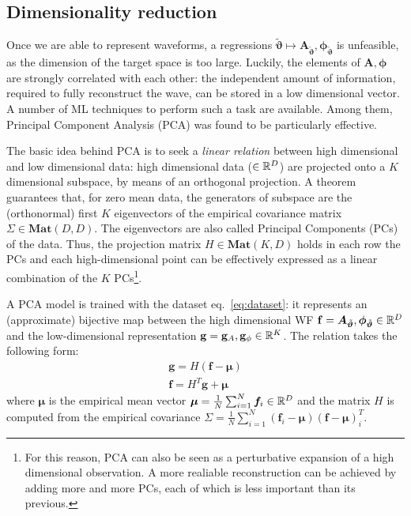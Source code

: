 \subsection{Dimensionality reduction}
Once we are able to represent waveforms, a regressions ${\tilde{\boldsymbol{\vartheta}}} \longmapsto \boldsymbol{A}_{{\tilde{\boldsymbol{\vartheta}}}}, \boldsymbol{\phi}_{{\tilde{\boldsymbol{\vartheta}}}}$ is unfeasible, as the dimension of the target space is too large. Luckily, the elements of $\boldsymbol{A}, \boldsymbol{\phi}$ are strongly correlated with each other: the independent amount of information, required to fully reconstruct the wave, can be stored in a low dimensional vector.
A number of ML techniques to perform such a task are available. Among them, Principal Component Analysis (PCA) \cite[ch. 12]{murphy2012machine} was found to be particularly effective.
\par
The basic idea behind PCA is to seek a \textit{linear relation} between high dimensional and low dimensional data: high dimensional data ($\in \mathbb{R}^D$) are projected onto a $K$ dimensional subspace, by means of an orthogonal projection.
A theorem \cite[sec. 12.2.1]{murphy2012machine} guarantees that, for zero mean data, the generators of subspace are the (orthonormal) first $K$ eigenvectors of the empirical covariance matrix $\Sigma \in \mathbf{Mat}(D,D)$. The eigenvectors are also called Principal Components (PCs) of the data.
Thus, the projection matrix $H\in \mathbf{Mat}(K,D)$ holds in each row the PCs and each high-dimensional point can be effectively expressed as a linear combination of the $K$ PCs\footnote{For this reason, PCA can also be seen as a perturbative expansion of a high dimensional observation. A more realiable reconstruction can be achieved by adding more and more PCs, each of which is less important than its previous.}.
\par
A PCA model is trained with the dataset eq.~\eqref{eq:dataset}: it represents an (approximate) bijective map between the high dimensional WF $\mathbf{f} = \boldsymbol{A}_{\tilde{\boldsymbol{\vartheta}}}, \boldsymbol{\phi}_{\tilde{\boldsymbol{\vartheta}}} \in \mathbb{R}^D$ and the low-dimensional representation $\mathbf{g} = \mathbf{g}_A , \mathbf{g}_\phi \in \mathbb{R}^K$.
The relation takes the following form:
\begin{align}
	\mathbf{g} = H (\mathbf{f} - \boldsymbol{\mu}) \label{eq:PCA_reduction_model}\\
	\mathbf{f} = H^T \mathbf{g} + \boldsymbol{\mu} \label{eq:PCA_reconstruction_model}
\end{align}
where $\boldsymbol{\mu}$ is the empirical mean vector ${\boldsymbol{\mu} = \frac{1}{N} \sum_{i=1}^N \boldsymbol{f}_i \in \mathbb{R}^D}$ and the matrix $H$ is computed from the empirical covariance ${\Sigma = \frac{1}{N} \sum_{i=1}^N (\mathbf{f}_i-\boldsymbol{\mu}) (\mathbf{f}-\boldsymbol{\mu})^T_i}$.
\par

